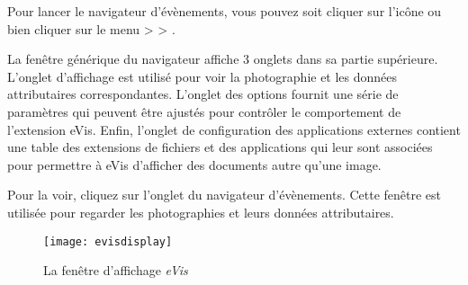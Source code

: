 Pour lancer le navigateur d'évènements, vous pouvez soit cliquer sur l'icône  ou bien cliquer sur le menu  >  > .


La fenêtre générique du navigateur affiche 3 onglets dans sa partie supérieure. L'onglet d'affichage est utilisé pour voir la photographie et les données attributaires correspondantes. L'onglet des options fournit une série de paramètres qui peuvent être ajustés pour contrôler le comportement de l'extension eVis. Enfin, l'onglet de configuration des applications externes contient une table des extensions de fichiers et des applications qui leur sont associées pour permettre à eVis d'afficher des documents autre qu'une image.

\label{evis_display_window}

Pour la voir, cliquez sur l'onglet  du navigateur d'évènements. Cette fenêtre est utilisée pour regarder les photographies et leurs données attributaires.

\begin{figure}[ht]
   \begin{center}
\caption{\label{evisdisplay}La fenêtre d'affichage \emph{eVis} \nixcaption}
\texttt{[image: evisdisplay]}
\end{center}
\end{figure}

